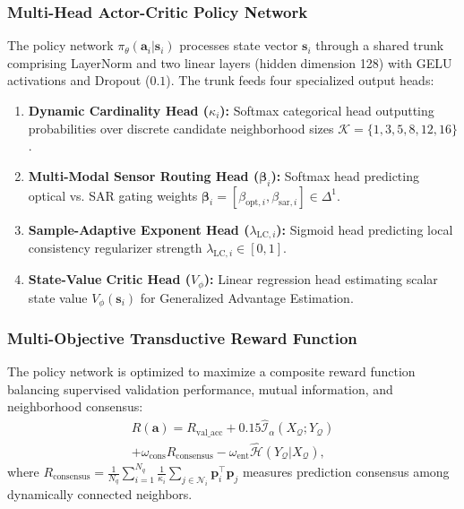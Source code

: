 \subsubsection{Multi-Head Actor-Critic Policy Network}
The policy network $\pi_\theta(\mathbf{a}_i | \mathbf{s}_i)$ processes state vector $\mathbf{s}_i$ through a shared trunk comprising LayerNorm and two linear layers (hidden dimension 128) with GELU activations and Dropout ($0.1$). The trunk feeds four specialized output heads:
\begin{enumerate}
    \item \textbf{Dynamic Cardinality Head ($\kappa_i$):} Softmax categorical head outputting probabilities over discrete candidate neighborhood sizes $\mathcal{K} = \{1, 3, 5, 8, 12, 16\}$.
    \item \textbf{Multi-Modal Sensor Routing Head ($\bm{\beta}_i$):} Softmax head predicting optical vs. SAR gating weights $\bm{\beta}_i = [\beta_{\text{opt}, i}, \beta_{\text{sar}, i}] \in \Delta^1$.
    \item \textbf{Sample-Adaptive Exponent Head ($\lambda_{\text{LC}, i}$):} Sigmoid head predicting local consistency regularizer strength $\lambda_{\text{LC}, i} \in [0, 1]$.
    \item \textbf{State-Value Critic Head ($V_\phi$):} Linear regression head estimating scalar state value $V_\phi(\mathbf{s}_i)$ for Generalized Advantage Estimation.
\end{enumerate}

\subsubsection{Multi-Objective Transductive Reward Function}
The policy network is optimized to maximize a composite reward function balancing supervised validation performance, mutual information, and neighborhood consensus:
\begin{equation}
\begin{split}
    R(\mathbf{a}) = R_{\text{val\_acc}} + 0.15 \hat{\mathcal{I}}_\alpha(X_{\mathcal{Q}}; Y_{\mathcal{Q}}) \\
    + \omega_{\text{cons}} R_{\text{consensus}} - \omega_{\text{ent}} \hat{\mathcal{H}}(Y_{\mathcal{Q}}|X_{\mathcal{Q}}),
\end{split}
    \label{eq:reward}
\end{equation}
where $R_{\text{consensus}} = \frac{1}{N_q} \sum_{i=1}^{N_q} \frac{1}{\kappa_i} \sum_{j \in \mathcal{N}_i} \bm{p}_i^\top \bm{p}_j$ measures prediction consensus among dynamically connected neighbors.

